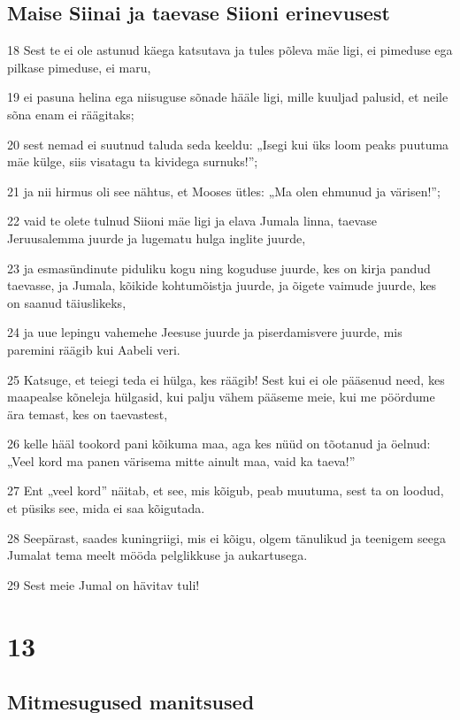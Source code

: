 \section*{Maise Siinai ja taevase Siioni erinevusest}

\par 18 Sest te ei ole astunud käega katsutava ja tules põleva mäe ligi, ei pimeduse ega pilkase pimeduse, ei maru,
\par 19 ei pasuna helina ega niisuguse sõnade hääle ligi, mille kuuljad palusid, et neile sõna enam ei räägitaks;
\par 20 sest nemad ei suutnud taluda seda keeldu: „Isegi kui üks loom peaks puutuma mäe külge, siis visatagu ta kividega surnuks!”;
\par 21 ja nii hirmus oli see nähtus, et Mooses ütles: „Ma olen ehmunud ja värisen!”;
\par 22 vaid te olete tulnud Siioni mäe ligi ja elava Jumala linna, taevase Jeruusalemma juurde ja lugematu hulga inglite juurde,
\par 23 ja esmasündinute piduliku kogu ning koguduse juurde, kes on kirja pandud taevasse, ja Jumala, kõikide kohtumõistja juurde, ja õigete vaimude juurde, kes on saanud täiuslikeks,
\par 24 ja uue lepingu vahemehe Jeesuse juurde ja piserdamisvere juurde, mis paremini räägib kui Aabeli veri.
\par 25 Katsuge, et teiegi teda ei hülga, kes räägib! Sest kui ei ole pääsenud need, kes maapealse kõneleja hülgasid, kui palju vähem pääseme meie, kui me pöördume ära temast, kes on taevastest,
\par 26 kelle hääl tookord pani kõikuma maa, aga kes nüüd on tõotanud ja öelnud: „Veel kord ma panen värisema mitte ainult maa, vaid ka taeva!”
\par 27 Ent „veel kord” näitab, et see, mis kõigub, peab muutuma, sest ta on loodud, et püsiks see, mida ei saa kõigutada.
\par 28 Seepärast, saades kuningriigi, mis ei kõigu, olgem tänulikud ja teenigem seega Jumalat tema meelt mööda pelglikkuse ja aukartusega.
\par 29 Sest meie Jumal on hävitav tuli!


\chapter{13}

\section*{Mitmesugused manitsused}

